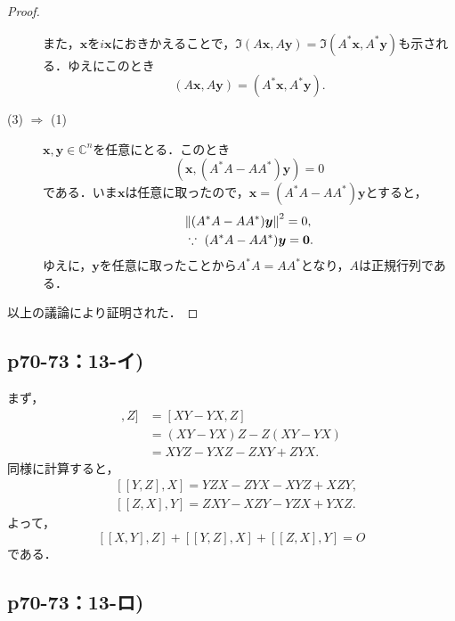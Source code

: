 \documentclass[uplatex,dvipdfmx,a4paper,11pt,fleqn]{jsarticle}
\begin{document}
\begin{tleftbar}
\begin{proof}
\begin{description}
        また，$\bm{x}$を$i\bm{x}$におきかえることで，$ \Im (A\bm{x}, A\bm{y}) = \Im (A^\ast \bm{x}, A^\ast\bm{y})$も示される．ゆえにこのとき
        \[
            (A\bm{x}, A\bm{y}) = (A^\ast \bm{x}, A^\ast\bm{y}).
        \]
        \item[(3) $\Longrightarrow$ (1)] $\bm{x},\bm{y} \in \mathbb{C}^n$を任意にとる．このとき
        \[
            (\bm{x}, (A^\ast A-A A^\ast)\bm{y}) =0
        \]
        である．いま$\bm{x}$は任意に取ったので，$\bm{x}=(A^\ast A-A A^\ast)\bm{y}$とすると，
        \begin{align*} 
            & \norm{(A^\ast A-A A^\ast)\bm{y}}^2  = 0, \\
            & \because ~ (A^\ast A-A A^\ast)\bm{y} = \bm{0}.
        \end{align*} 
        ゆえに，$\bm{y}$を任意に取ったことから$A^\ast A=A A^\ast$となり，$A$は正規行列である．
    \end{description}
    以上の議論により証明された．
\end{proof}
\end{tleftbar}

\newpage 


\subsection*{p70-73：13-イ)}

\begin{tleftbar}
    まず，
\begin{align*} 
    [ [X,Y],Z ] & = [XY-YX,Z] \\
    & = (XY-YX)Z -Z(XY-YX) \\
    & = XYZ -YXZ -ZXY +ZYX.
\end{align*}
同様に計算すると，
\begin{align*} 
    & [[Y,Z],X] = YZX -ZYX -XYZ +XZY, \\
    & [ [Z,X],Y] = ZXY -XZY -YZX +YXZ.
\end{align*} 
よって，
\[
    [[X,Y],Z] +[[Y,Z],X]+[[Z,X],Y]=O
\]
である．
\end{tleftbar}

\subsection*{p70-73：13-ロ)}
\end{document}
